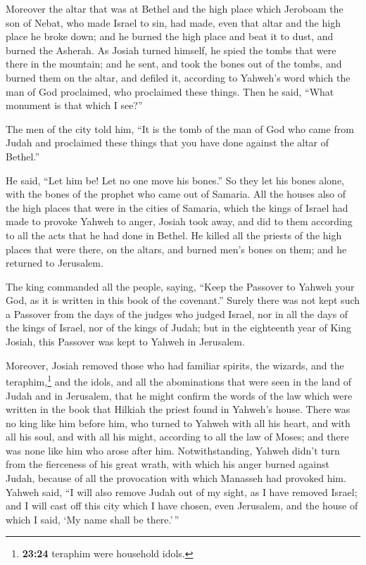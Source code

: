  Moreover the altar that was at Bethel and the high place
which Jeroboam the son of Nebat, who made Israel to sin, had made, even
that altar and the high place he broke down; and he burned the high
place and beat it to dust, and burned the Asherah.  As
Josiah turned himself, he spied the tombs that were there in the
mountain; and he sent, and took the bones out of the tombs, and burned
them on the altar, and defiled it, according to Yahweh's word which the
man of God proclaimed, who proclaimed these things.  Then
he said, ``What monument is that which I see?''

The men of the city told him, ``It is the tomb of the man of God who
came from Judah and proclaimed these things that you have done against
the altar of Bethel.''

 He said, ``Let him be! Let no one move his bones.'' So
they let his bones alone, with the bones of the prophet who came out of
Samaria.  All the houses also of the high places that
were in the cities of Samaria, which the kings of Israel had made to
provoke Yahweh to anger, Josiah took away, and did to them according to
all the acts that he had done in Bethel.  He killed all
the priests of the high places that were there, on the altars, and
burned men's bones on them; and he returned to Jerusalem.

 The king commanded all the people, saying, ``Keep the
Passover to Yahweh your God, as it is written in this book of the
covenant.''  Surely there was not kept such a Passover
from the days of the judges who judged Israel, nor in all the days of
the kings of Israel, nor of the kings of Judah;  but in
the eighteenth year of King Josiah, this Passover was kept to Yahweh in
Jerusalem.

 Moreover, Josiah removed those who had familiar spirits,
the wizards, and the teraphim,\footnote{\textbf{23:24} teraphim were
  household idols.} and the idols, and all the abominations that were
seen in the land of Judah and in Jerusalem, that he might confirm the
words of the law which were written in the book that Hilkiah the priest
found in Yahweh's house.  There was no king like him
before him, who turned to Yahweh with all his heart, and with all his
soul, and with all his might, according to all the law of Moses; and
there was none like him who arose after him. 
Notwithstanding, Yahweh didn't turn from the fierceness of his great
wrath, with which his anger burned against Judah, because of all the
provocation with which Manasseh had provoked him.  Yahweh
said, ``I will also remove Judah out of my sight, as I have removed
Israel; and I will cast off this city which I have chosen, even
Jerusalem, and the house of which I said, `My name shall be there.'\,''

